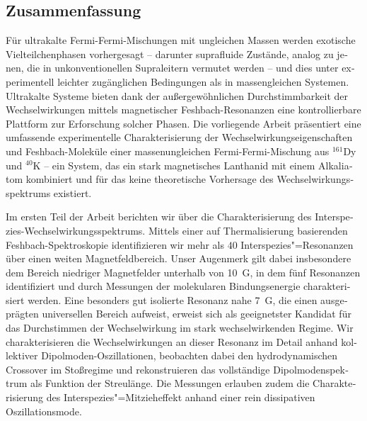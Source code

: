 \begin{otherlanguage}{ngerman}
\chapter*{Zusammenfassung}
Für ultrakalte Fermi-Fermi-Mischungen mit ungleichen Massen werden exotische Vielteilchenphasen vorhergesagt – darunter suprafluide Zustände, analog zu jenen, die in unkonventionellen Supraleitern vermutet werden – und dies unter experimentell leichter zugänglichen Bedingungen als in massengleichen Systemen. Ultrakalte Systeme bieten dank der außergewöhnlichen Durchstimmbarkeit der Wechselwirkungen mittels magnetischer Feshbach-Resonanzen eine kontrollierbare Plattform zur Erforschung solcher Phasen. Die vorliegende Arbeit präsentiert eine umfassende experimentelle Charakterisierung der Wechselwirkungseigenschaften und Feshbach-Moleküle einer massenungleichen Fermi-Fermi-Mischung aus $^{161}$Dy und $^{40}$K – ein System, das ein stark magnetisches Lanthanid mit einem Alkaliatom kombiniert und für das keine theoretische Vorhersage des Wechselwirkungsspektrums existiert.

Im ersten Teil der Arbeit berichten wir über die Charakterisierung des Interspezies-Wechselwirkungsspektrums. Mittels einer auf Thermalisierung basierenden Feshbach-Spektroskopie identifizieren wir mehr als $40$  Interspezies"=Resonanzen über einen weiten Magnetfeldbereich. Unser Augenmerk gilt dabei insbesondere dem Bereich niedriger Magnetfelder unterhalb von \SI{10}{G}, in dem fünf Resonanzen identifiziert und durch Messungen der molekularen Bindungsenergie charakterisiert werden. Eine besonders gut isolierte Resonanz nahe \SI{7}{G}, die einen ausgeprägten universellen Bereich aufweist, erweist sich als geeignetster Kandidat für das Durchstimmen der Wechselwirkung im stark wechselwirkenden Regime. Wir charakterisieren die Wechselwirkungen an dieser Resonanz im Detail anhand kollektiver Dipolmoden-Oszillationen, beobachten dabei den hydrodynamischen Crossover im Stoßregime und rekonstruieren das vollständige Dipolmodenspektrum als Funktion der Streulänge. Die Messungen erlauben zudem die Charakterisierung des Interspezies"=Mitzieheffekt anhand einer rein dissipativen Oszillationsmode.


\end{otherlanguage}
